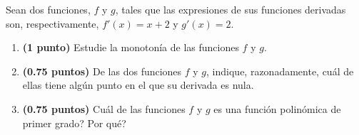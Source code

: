 
Sean dos funciones, $f$ y $g$, tales que las expresiones de sus funciones derivadas son, respectivamente, $f'(x)=x+2$ y $g'(x)=2$.
\begin{enumerate}[label=\alph*)]
\item \textbf{(1 punto)} Estudie la monotonía de las funciones $f$ y $g$.
\item \textbf{(0.75 puntos)} De las dos funciones $f$ y $g$, indique, razonadamente, cuál de ellas tiene algún punto en el que su derivada es nula.
\item \textbf{(0.75 puntos)} \textquestiondown{}Cuál de las funciones $f$ y $g$ es una función polinómica de primer grado? \textquestiondown{}Por qué?
\end{enumerate}
